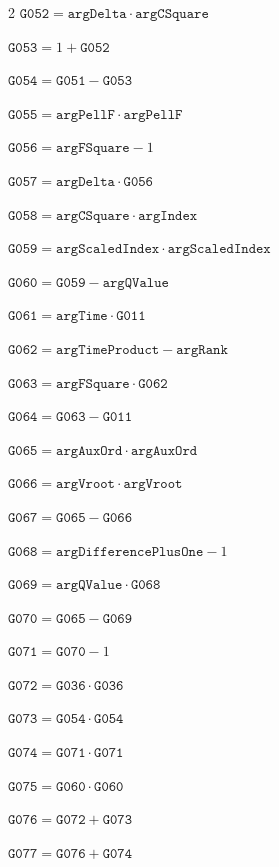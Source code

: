 \documentclass[10pt]{article}
\begin{document}
\begin{multicols}{2}
\noindent $\mathtt{G052}=\mathtt{argDelta}\cdot \mathtt{argCSquare}$\par
\noindent $\mathtt{G053}=1+\mathtt{G052}$\par
\noindent $\mathtt{G054}=\mathtt{G051}-\mathtt{G053}$\par
\noindent $\mathtt{G055}=\mathtt{argPellF}\cdot \mathtt{argPellF}$\par
\noindent $\mathtt{G056}=\mathtt{argFSquare}-1$\par
\noindent $\mathtt{G057}=\mathtt{argDelta}\cdot \mathtt{G056}$\par
\noindent $\mathtt{G058}=\mathtt{argCSquare}\cdot \mathtt{argIndex}$\par
\noindent $\mathtt{G059}=\mathtt{argScaledIndex}\cdot \mathtt{argScaledIndex}$\par
\noindent $\mathtt{G060}=\mathtt{G059}-\mathtt{argQValue}$\par
\noindent $\mathtt{G061}=\mathtt{argTime}\cdot \mathtt{G011}$\par
\noindent $\mathtt{G062}=\mathtt{argTimeProduct}-\mathtt{argRank}$\par
\noindent $\mathtt{G063}=\mathtt{argFSquare}\cdot \mathtt{G062}$\par
\noindent $\mathtt{G064}=\mathtt{G063}-\mathtt{G011}$\par
\noindent $\mathtt{G065}=\mathtt{argAuxOrd}\cdot \mathtt{argAuxOrd}$\par
\noindent $\mathtt{G066}=\mathtt{argVroot}\cdot \mathtt{argVroot}$\par
\noindent $\mathtt{G067}=\mathtt{G065}-\mathtt{G066}$\par
\noindent $\mathtt{G068}=\mathtt{argDifferencePlusOne}-1$\par
\noindent $\mathtt{G069}=\mathtt{argQValue}\cdot \mathtt{G068}$\par
\noindent $\mathtt{G070}=\mathtt{G065}-\mathtt{G069}$\par
\noindent $\mathtt{G071}=\mathtt{G070}-1$\par
\noindent $\mathtt{G072}=\mathtt{G036}\cdot \mathtt{G036}$\par
\noindent $\mathtt{G073}=\mathtt{G054}\cdot \mathtt{G054}$\par
\noindent $\mathtt{G074}=\mathtt{G071}\cdot \mathtt{G071}$\par
\noindent $\mathtt{G075}=\mathtt{G060}\cdot \mathtt{G060}$\par
\noindent $\mathtt{G076}=\mathtt{G072}+\mathtt{G073}$\par
\noindent $\mathtt{G077}=\mathtt{G076}+\mathtt{G074}$\par

\end{multicols}
\end{document}
